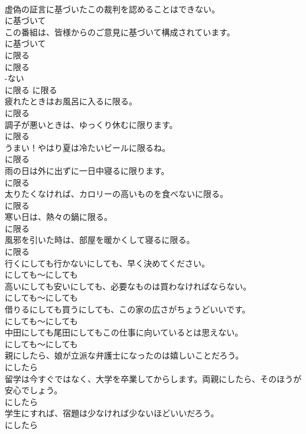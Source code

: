 \documentclass[8pt]{extreport}
\begin{document}
\begin{CJK}{UTF8}{min}
\\	虚偽の証言に基づいたこの裁判を認めることはできない。	
\\	に基づいて	
\\	この番組は、皆様からのご意見に基づいて構成されています。	
\\	に基づいて	
\\	に限る	
\\	に限る	
\\	-ない
\\	に限る	に限る	
\\	疲れたときはお風呂に入るに限る。	
\\	に限る	
\\	調子が悪いときは、ゆっくり休むに限ります。	
\\	に限る	
\\	うまい！やはり夏は冷たいビールに限るね。	
\\	に限る	
\\	雨の日は外に出ずに一日中寝るに限ります。	
\\	に限る	
\\	太りたくなければ、カロリーの高いものを食べないに限る。	
\\	に限る	
\\	寒い日は、熱々の鍋に限る。	
\\	に限る	
\\	風邪を引いた時は、部屋を暖かくして寝るに限る。	
\\	に限る	
\\	行くにしても行かないにしても、早く決めてください。	
\\	にしても～にしても	
\\	高いにしても安いにしても、必要なものは買わなければならない。	
\\	にしても～にしても	
\\	借りるにしても買うにしても、この家の広さがちょうどいいです。	
\\	にしても～にしても	
\\	中田にしても尾田にしてもこの仕事に向いているとは思えない。	
\\	にしても～にしても	
\\	親にしたら、娘が立派な弁護士になったのは嬉しいことだろう。	
\\	にしたら	
\\	留学は今すぐではなく、大学を卒業してからします。両親にしたら、そのほうが安心でしょう。	
\\	にしたら	
\\	学生にすれば、宿題は少なければ少ないほどいいだろう。	
\\	にしたら	

\end{CJK}
\end{document}
